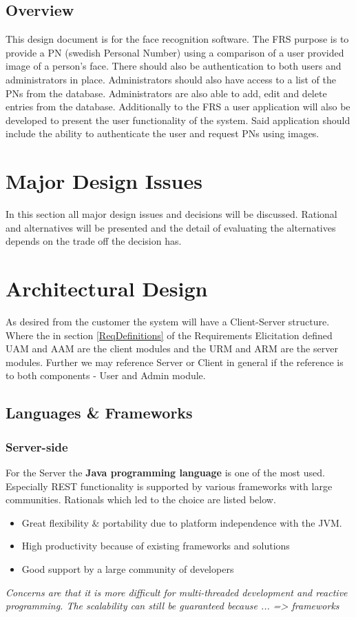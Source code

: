 \documentclass[a4paper,11pt]{article}
\begin{document}
\subsection{Overview}
This design document is for the face recognition software. The FRS purpose is to provide a PN (swedish Personal Number) using a comparison of a user provided image of a person's face. There should also be authentication to both users and administrators in place. Administrators should also have access to a list of the PNs from the database. Administrators are also able to add, edit and delete entries from the database.
Additionally to the FRS a user application will also be developed to present the user functionality of the system. Said application should include the ability to authenticate the user and request PNs using images.

\section{Major Design Issues}
In this section all major design issues and decisions will be discussed. Rational and alternatives will be presented and the detail of evaluating the alternatives depends on the trade off the decision has.

\section{Architectural Design}
As desired from the customer the system will have a Client-Server structure. Where the in section \ref{ReqDefinitions} of the Requirements Elicitation defined UAM and AAM are the client modules and the URM and ARM are the server modules. Further we may reference Server or Client in general if  the reference is to both components - User and Admin module.

\subsection{Languages \& Frameworks}
\subsubsection{Server-side}
For the Server the \textbf{Java programming language} is one of the most used. Especially REST functionality is supported by various frameworks with large communities. Rationals which led to the choice are listed below.
\begin{itemize}
\item Great flexibility \& portability due to platform independence with the JVM.
\item High productivity because of existing frameworks and solutions
\item Good support by a large community of developers
\end{itemize}
\textit{Concerns are that it is more difficult for multi-threaded development and reactive programming. The scalability can still be guaranteed because ... => frameworks}
\end{document}
